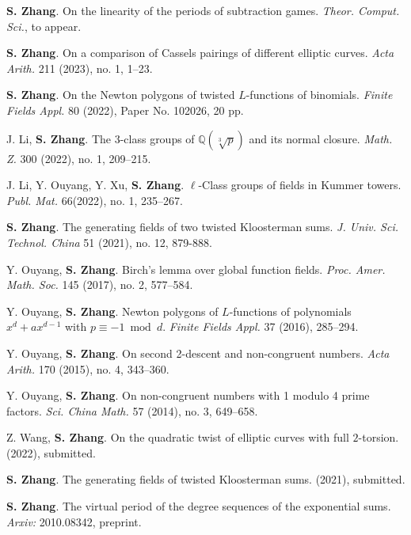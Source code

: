 \documentclass[11pt]{article}
\begin{document}
\newpage
{}
\begin{cvlist}
	\item \textbf{S. Zhang}.
	On the linearity of the periods of subtraction games.
	{\em Theor. Comput. Sci.}, to appear.
	
	\item \textbf{S. Zhang}.
	On a comparison of Cassels pairings of different elliptic curves.
	{\em Acta Arith.} 211 (2023), no. 1, 1--23.

	\item \textbf{S. Zhang}.
	On the Newton polygons of twisted $L$-functions of binomials.
	{\em Finite Fields Appl.} 80 (2022), Paper No. 102026, 20 pp.

	\item J. Li, \textbf{S. Zhang}.
	The $3$-class groups of $\mathbb{Q}(\sqrt[3]{p})$ and its normal closure.
	{\em Math. Z.} 300 (2022), no. 1, 209--215.

	\item J. Li, Y. Ouyang, Y. Xu, \textbf{S. Zhang}.
	$\ell$-Class groups of fields in Kummer towers.
	{\em Publ. Mat.} 66(2022), no. 1, 235--267.

	\item \textbf{S. Zhang}.
	The generating fields of two twisted Kloosterman sums.
	{\em J. Univ. Sci. Technol. China} 51 (2021), no. 12, 879-888.

	\item Y. Ouyang, \textbf{S. Zhang}.
	Birch's lemma over global function fields.
	{\em Proc. Amer. Math. Soc.} 145 (2017), no. 2, 577--584.

	\item Y. Ouyang, \textbf{S. Zhang}.
	Newton polygons of $L$-functions of polynomials $x^d+ax^{d-1}$ with $p\equiv -1 \bmod d$.
	{\em Finite Fields Appl.} 37 (2016), 285--294.

	\item Y. Ouyang, \textbf{S. Zhang}.
	On second 2-descent and non-congruent numbers.
	{\em Acta Arith.} 170 (2015), no. 4, 343--360.

	\item Y. Ouyang, \textbf{S. Zhang}.
	On non-congruent numbers with 1 modulo 4 prime factors.
	{\em Sci. China Math.} 57 (2014), no. 3, 649--658.
	\end{cvlist}


	\begin{cvlist}
	\item Z. Wang, \textbf{S. Zhang}.
	On the quadratic twist of elliptic curves with full $2$-torsion.
	(2022), submitted.

	\item \textbf{S. Zhang}.
	The generating fields of twisted Kloosterman sums.
	(2021), submitted.

	\item \textbf{S. Zhang}.
	The virtual period of the degree sequences of the exponential sums.
	{\em Arxiv:} 2010.08342, preprint.
\end{cvlist}
\end{document}
